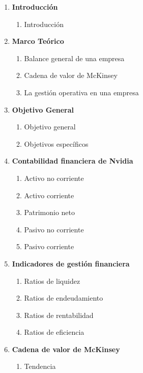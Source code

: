 \documentclass{article}
\newenvironment{indexPre}{}{}
\begin{document}
\begin{indexPre}
\begin{spacing}{1.15} %
  \noindent
  \renewcommand{\labelenumii}{\theenumi.\arabic{enumii}}
  \begin{enumerate}
    \item \textbf{Introducción}
    \begin{enumerate}
      \item Introducción
    \end{enumerate}
    \item \textbf{Marco Teórico}
    \begin{enumerate}
      \item Balance general de una empresa
      \item Cadena de valor de McKinsey
      \item La gestión operativa en una empresa
    \end{enumerate}
    \item \textbf{Objetivo General}
    \begin{enumerate}
      \item Objetivo general
      \item Objetivos específicos
    \end{enumerate}
    \item \textbf{Contabilidad financiera de Nvidia}
    \begin{enumerate}
      \item Activo no corriente
      \item Activo corriente
      \item Patrimonio neto
      \item Pasivo no corriente
      \item Pasivo corriente
    \end{enumerate}
    \item \textbf{Indicadores de gestión financiera}
    \begin{enumerate}
      \item Ratios de liquidez
      \item Ratios de endeudamiento
      \item Ratios de rentabilidad
      \item Ratios de eficiencia
    \end{enumerate}
    \item \textbf{Cadena de valor de McKinsey}
    \begin{enumerate}
      \item Tendencia

\end{enumerate}
\end{enumerate}
\end{spacing}
\end{indexPre}
\end{document}
